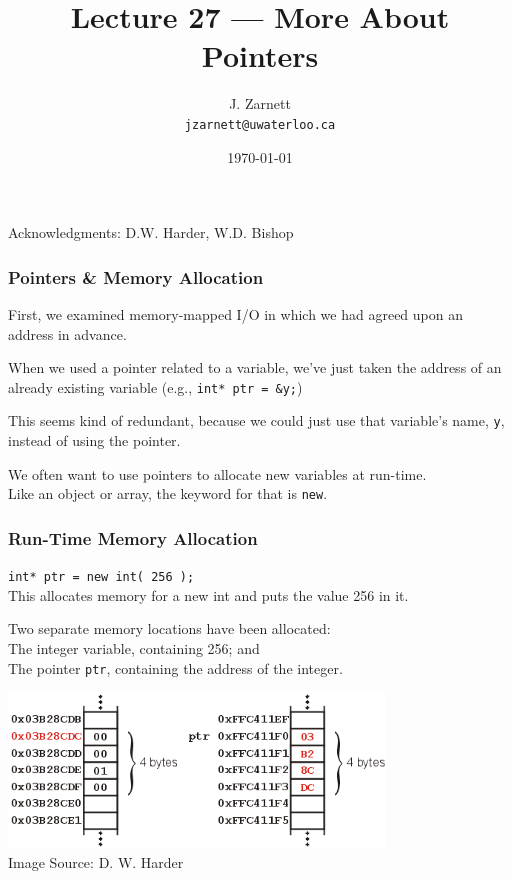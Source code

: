 

\title{Lecture 27 --- More About Pointers}

\author{J. Zarnett\\
\texttt{jzarnett@uwaterloo.ca}}
\date{\today}



\begin{frame}
  \titlepage
  
  \begin{center}
  \small{Acknowledgments: D.W. Harder, W.D. Bishop}
  \end{center}
\end{frame}


\begin{frame}
\frametitle{Pointers \& Memory Allocation}
First, we examined memory-mapped I/O in which we had agreed upon an address in advance.

When we used a pointer related to a variable, we've just taken the address of an already existing variable (e.g., \texttt{int* ptr = \&y;})

This seems kind of redundant, because we could just use that variable's name, \texttt{y}, instead of using the pointer.

We often want to use pointers to allocate new variables at run-time.\\
\quad Like an object or array, the keyword for that is \texttt{new}.

\end{frame}

\begin{frame}
\frametitle{Run-Time Memory Allocation}
\texttt{int* ptr = new int( 256 );}\\
\quad This allocates memory for a new int and puts the value 256 in it.

Two separate memory locations have been allocated:\\
\quad The integer variable, containing 256; and\\
\quad The pointer \texttt{ptr}, containing the address of the integer.

\begin{center}
\includegraphics[width=0.75\textwidth]{images/new01.png}\\
{\tiny Image Source: D. W. Harder}
\end{center}

\end{frame}

